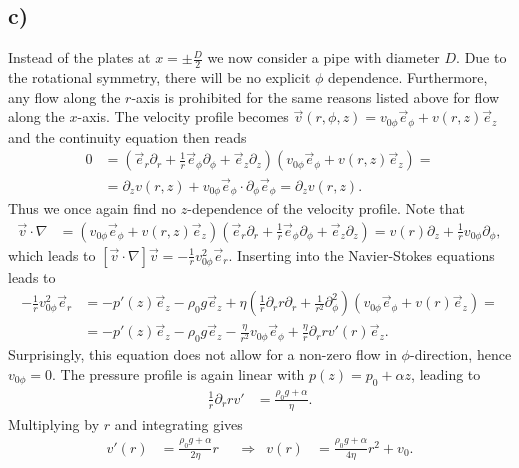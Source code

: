 \documentclass[english, parskip=full]{scrartcl}
\newcommand{\kla}{}
\begin{document}
\subsection*{c)}
Instead of the plates at $x=\pm\frac{D}{2}$ we now consider a pipe with diameter $D$.
Due to the rotational symmetry, there will be no explicit $\phi$ dependence.
Furthermore, any flow along the $r$-axis is prohibited for the same reasons listed above for flow along the $x$-axis.
The velocity profile becomes $\vec{v}(r,\phi,z) = v_{0\phi}\vec{e}_\phi + v(r,z)\vec{e}_z$ and the continuity equation then reads 
\begin{align}
0 &= \kla\left( {\vec{e}_r\partial_r + \frac{1}{r}\vec{e}_\phi\partial_\phi + \vec{e}_z\partial_z} \right) \kla\left( {v_{0\phi}\vec{e}_\phi + v(r,z)\vec{e}_z} \right) = \\
&= \partial_zv(r,z) + v_{0\phi} \vec{e}_\phi\cdot \partial_\phi \vec{e}_\phi = \partial_zv(r,z).
\end{align}
Thus we once again find no $z$-dependence of the velocity profile.
Note that 
\begin{align}
\vec{v}\cdot\nabla  &= \kla\left( {v_{0\phi}\vec{e}_\phi + v(r,z)\vec{e}_z} \right) \kla\left( {\vec{e}_r\partial_r + \frac{1}{r}\vec{e}_\phi\partial_\phi + \vec{e}_z\partial_z} \right) = v(r)\partial_z + \frac{1}{r}v_{0\phi}\partial_\phi,
\end{align}
which leads to $[\vec{v}\cdot\nabla]\vec{v} = - \frac{1}{r}v_{0\phi}^2\vec{e}_r $.
Inserting into the Navier-Stokes equations leads to
\begin{align}
- \frac{1}{r}v_{0\phi}^2\vec{e}_r &= -p'(z)\vec{e}_z - \rho_0g\vec{e}_z + \eta\kla\left( {\frac{1}{r}\partial_rr\partial_r + \frac{1}{r^2} \partial_\phi^2} \right) \kla\left( {v_{0\phi}\vec{e}_\phi + v(r)\vec{e}_z} \right) = \\
&= -p'(z)\vec{e}_z - \rho_0g\vec{e}_z - \frac{\eta}{r^2}v_{0\phi}\vec{e}_\phi + \frac{\eta}{r}\partial_r rv'(r)\vec{e}_z.
\end{align}
Surprisingly, this equation does not allow for a non-zero flow in $\phi$-direction, hence $v_{0\phi} = 0$.
The pressure profile is again linear with $p(z) = p_0 + \alpha z$, leading to
\begin{align}
\frac{1}{r}\partial_rrv' &= \frac{\rho_0g + \alpha}{\eta}.
\end{align}
Multiplying by $r$ and integrating gives
\begin{align}
v'(r) &= \frac{\rho_0g + \alpha}{2\eta}r &&\Rightarrow & v(r) &= \frac{\rho_0g + \alpha}{4\eta}r^2 + v_0.
\end{align}
\end{document}
